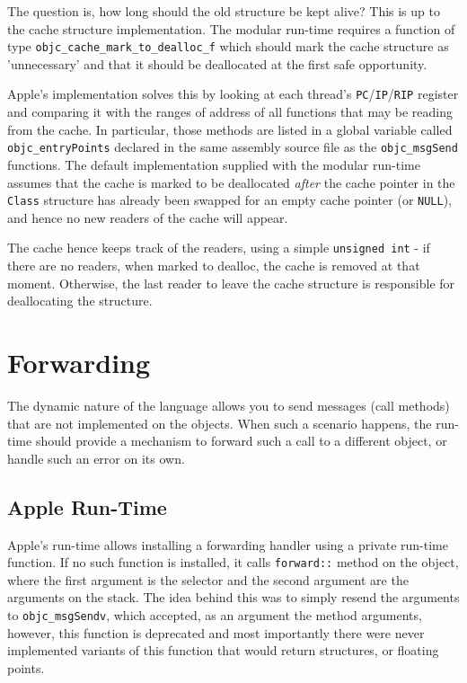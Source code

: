 The question is, how long should the old structure be kept alive? This is up to the cache structure implementation. The modular run-time requires a function of type \verb=objc_cache_mark_to_dealloc_f= which should mark the cache structure as 'unnecessary' and that it should be deallocated at the first safe opportunity.

Apple's implementation solves this by looking at each thread's \verb=PC=/\verb=IP=/\verb=RIP= register and comparing it with the ranges of address of all functions that may be reading from the cache. In particular, those methods are listed in a global variable called \verb=objc_entryPoints= declared in the same assembly source file as the \verb=objc_msgSend= functions. The default implementation supplied with the modular run-time assumes that the cache is marked to be deallocated \emph{after} the cache pointer in the \verb=Class= structure has already been swapped for an empty cache pointer (or \verb=NULL=), and hence no new readers of the cache will appear.

The cache hence keeps track of the readers, using a simple \verb=unsigned int= - if there are no readers, when marked to dealloc, the cache is removed at that moment. Otherwise, the last reader to leave the cache structure is responsible for deallocating the structure.

\section{Forwarding}

The dynamic nature of the language allows you to send messages (call methods) that are not implemented on the objects. When such a scenario happens, the run-time should provide a mechanism to forward such a call to a different object, or handle such an error on its own.

\subsection{Apple Run-Time}

Apple's run-time allows installing a forwarding handler using a private run-time function. If no such function is installed, it calls \verb=forward::= method on the object, where the first argument is the selector and the second argument are the arguments on the stack. The idea behind this was to simply resend the arguments to \verb=objc_msgSendv=, which accepted, as an argument the method arguments, however, this function is deprecated and most importantly there were never implemented variants of this function that would return structures, or floating points.

